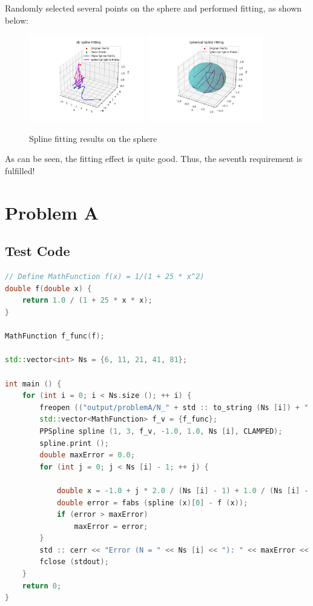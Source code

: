 \documentclass[a4paper]{article}
\begin{document}
Randomly selected several points on the sphere and performed fitting, as shown below:
\begin{figure}[H]
    \centering
    \includegraphics[width=0.45\textwidth]{./figure/Sphere/spline_fitting_all.png}
    \includegraphics[width=0.45\textwidth]{./figure/Sphere/spline_fitting_spherical.png}
    \caption{Spline fitting results on the sphere}
\end{figure}

As can be seen, the fitting effect is quite good. Thus, the seventh requirement is fulfilled!

\section{Problem A}

\subsection{Test Code}

\begin{lstlisting}[language=C++]
// Define MathFunction f(x) = 1/(1 + 25 * x^2)
double f(double x) {
    return 1.0 / (1 + 25 * x * x);
}

MathFunction f_func(f);

std::vector<int> Ns = {6, 11, 21, 41, 81};

int main () {
    for (int i = 0; i < Ns.size (); ++ i) {
        freopen (("output/problemA/N_" + std :: to_string (Ns [i]) + ".txt").c_str (), "w", stdout);
        std::vector<MathFunction> f_v = {f_func};
        PPSpline spline (1, 3, f_v, -1.0, 1.0, Ns [i], CLAMPED); 
        spline.print ();
        double maxError = 0.0;
        for (int j = 0; j < Ns [i] - 1; ++ j) {
            
            double x = -1.0 + j * 2.0 / (Ns [i] - 1) + 1.0 / (Ns [i] - 1);
            double error = fabs (spline (x)[0] - f (x));
            if (error > maxError)
                maxError = error;
        }
        std :: cerr << "Error (N = " << Ns [i] << "): " << maxError << std :: endl;
        fclose (stdout);
    }
    return 0;
}
\end{lstlisting}
\end{document}
